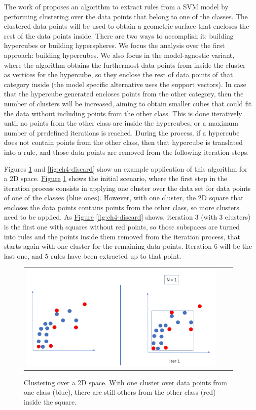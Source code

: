 The work of \parencite{nunez2002rule} proposes an algorithm to extract rules from a SVM model by performing clustering over the data points that belong to one of the classes. The clustered data points will be used to obtain a geometric surface that encloses the rest of the data points inside. There are two ways to accomplish it: building hypercubes or building hyperspheres. We focus the analysis over the first approach: building hypercubes. We also focus in the model-agnostic variant, where the algorithm obtains the furthermost data points from inside the cluster as vertices for the hypercube, so they enclose the rest of data points of that category inside (the model specific alternative uses the support vectors). In case that the hypercube generated encloses points from the other category, then the number of clusters will be increased, aiming to obtain smaller cubes that could fit the data without including points from the other class. This is done iteratively until no points from the other class are inside the hypercubes, or a maximum number of predefined iterations is reached. During the process, if a hypercube does not contain points from the other class, then that hypercube is translated into a rule, and those data points are removed from the following iteration steps.

Figures \ref{fig:ch4-starting-point} and \ref{fig:ch4-discard} show an example application of this algorithm for a 2D space. \hyperref[fig:ch4-starting-point]{Figure} \ref{fig:ch4-starting-point} shows the initial scenario, where the first step in the iteration process consists in applying one cluster over the data set for data points of one of the classes (blue ones). However, with one cluster, the 2D square that encloses the data points contains points from the other class, so more clusters need to be applied. As \hyperref[fig:ch4-discard]{Figure} \ref{fig:ch4-discard} shows, iteration 3 (with 3 clusters) is the first one with squares without red points, so those subspaces are turned into rules and the points inside them removed from the iteration process, that starts again with one cluster for the remaining data points. Iteration 6 will be the last one, and 5 rules have been extracted up to that point.

\begin{figure}[!h]
\centering
  \begin{tabular}{c@{\qquad}c@{\qquad}c}
\includegraphics[width=0.7\columnwidth]{figures/chapter4_RuleExtraction/start.png}
  \end{tabular} 
  \caption{Clustering over a 2D space. With one cluster over data points from one class (blue), there are still others from the other class (red) inside the square.\label{fig:ch4-starting-point}}
\end{figure}


